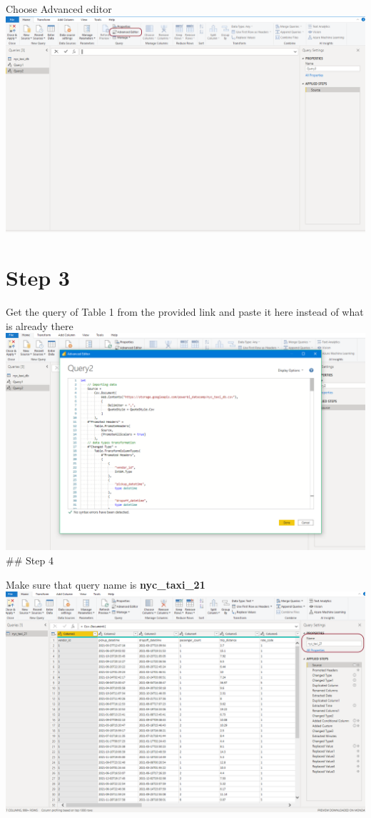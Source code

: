 \documentclass[
]{book}
\begin{document}
Choose Advanced editor
\includegraphics{assets/get_data2.png}

\hypertarget{step-3}{%
\section{Step 3}\label{step-3}}

Get the query of Table 1 from the provided link and paste it here instead of
what is already there
\includegraphics{assets/query_1.png}
\#\# Step 4

Make sure that query name is \textbf{nyc\_taxi\_21}
\includegraphics{assets/query_1b.png}
\end{document}
